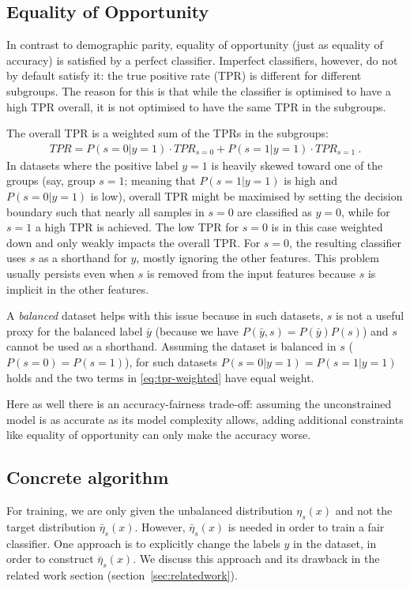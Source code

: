 \subsection{Equality of Opportunity}\label{ssec:eqopp}
In contrast to demographic parity,
equality of opportunity (just as equality of accuracy) is satisfied by a perfect classifier.
Imperfect classifiers, however, do not by default satisfy it:
the true positive rate (TPR) is different for different subgroups.
The reason for this is that while the classifier is optimised to have a high TPR overall,
it is not optimised to have the same TPR in the subgroups.

The overall TPR is a weighted sum of the TPRs in the subgroups:
\begin{align}
  \mathit{TPR}= P(s=0|y=1) \cdot \mathit{TPR}_{s=0} + P(s=1|y=1) \cdot \mathit{TPR}_{s=1}~.\label{eq:tpr-weighted}
\end{align}
In datasets where the positive label $y=1$ is heavily skewed toward one of the groups
(say, group $s=1$; meaning that $P(s=1|y=1)$ is high and $P(s=0|y=1)$ is low),
overall TPR might be maximised by setting the decision boundary
such that nearly all samples in $s=0$ are classified as $y=0$,
while for $s=1$ a high TPR is achieved.
The low TPR for $s=0$ is in this case weighted down and only weakly impacts the overall TPR\@.
For $s=0$, the resulting classifier uses $s$ as a shorthand for $y$, mostly ignoring the other features.
This problem usually persists even when $s$ is removed from the input features
because $s$ is implicit in the other features.

A \emph{balanced} dataset helps with this issue
because in such datasets, $s$ is not a useful proxy for the balanced label $\bar{y}$
(because we have $P(\bar{y}, s)=P(\bar{y})P(s)$) and $s$ cannot be used as a shorthand.
Assuming the dataset is balanced in $s$ ($P(s=0)=P(s=1)$),
for such datasets $P(s=0|y=1)=P(s=1|y=1)$ holds and the two terms in \eqref{eq:tpr-weighted} have equal weight.

Here as well there is an accuracy-fairness trade-off:
assuming the unconstrained model is as accurate as its model complexity allows,
adding additional constraints like equality of opportunity can only make the accuracy worse.

\subsection{Concrete algorithm}
For training, we are only given the unbalanced distribution $\eta_s(x)$
and not the target distribution $\bar{\eta}_s(x)$.
However, $\bar{\eta}_s(x)$ is needed in order to train a fair classifier.
One approach is to explicitly change the labels $y$ in the dataset, in order to construct $\bar{\eta}_s(x)$.
We discuss this approach and its drawback in the related work section (section~\ref{sec:relatedwork}).

